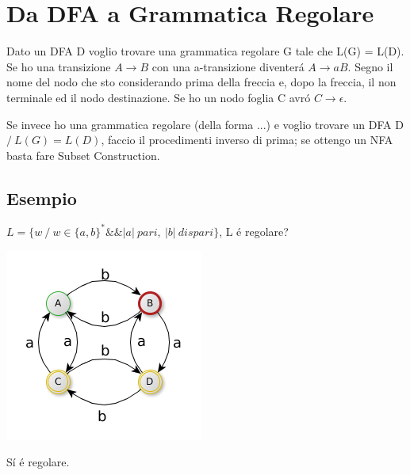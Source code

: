 \section{Da DFA a Grammatica Regolare}
Dato un DFA D voglio trovare una grammatica regolare G tale che L(G) = L(D). 
Se ho una transizione $A \rightarrow B$ con una a-transizione diventer\'a $A \rightarrow aB$. Segno il nome del nodo che sto considerando
prima della freccia e, dopo la freccia, il non terminale ed il nodo destinazione. Se ho un nodo foglia C avr\'o  $C \rightarrow \epsilon$.

Se invece ho una grammatica regolare (della forma ...) e voglio trovare un DFA D $/\ L(G) = L(D)$, faccio il procedimenti inverso di prima;
se ottengo un NFA basta fare Subset Construction.

\subsection{Esempio}
$L=\{ w \ / \ w \in \{ a, b \} ^* \&\& |a|\ pari,\ |b|\ dispari \}$, L \'e regolare?
\begin{center}
	\includegraphics[scale=0.5]{Chapters/Img/c02_12.png}\\
\end{center} 
S\'i \'e regolare.

